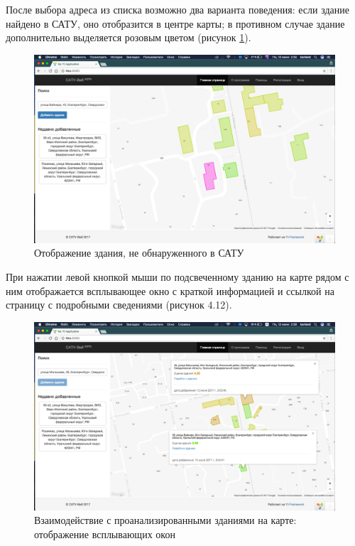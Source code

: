 	После выбора адреса из списка возможно два варианта поведения: если здание найдено в САТУ, оно отобразится в центре карты; в противном случае здание дополнительно выделяется розовым цветом (рисунок \ref{scrshot:main_new_1}).

	\begin{figure}[t!]
		\centering
		\includegraphics[width=1\textwidth]{images/scrshots/main_new_1}
		\caption{Отображение здания, не обнаруженного в САТУ}
		\label{scrshot:main_new_1}
	\end{figure}


	При нажатии левой кнопкой мыши по подсвеченному зданию на карте рядом с ним отображается всплывающее окно с краткой информацией и ссылкой на страницу с подробными сведениями (рисунок 4.12).

	\begin{figure}[t!]
		\centering
		\includegraphics[width=1\textwidth]{images/scrshots/main_selected_1}
		\caption{Взаимодействие с проанализированными зданиями на карте: отображение всплывающих окон}
		\label{scrshot:main_selected_1}
	\end{figure}

